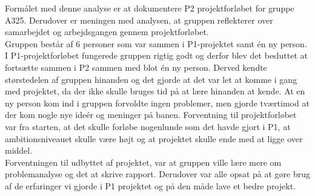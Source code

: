 Formålet med denne analyse er at dokumentere P2 projektforløbet for gruppe A325. Derudover er meningen med analysen, at gruppen reflekterer over samarbejdet og arbejdsgangen gennem projektforløbet.
\\
Gruppen består af 6 personer som var sammen i P1-projektet samt én ny person. I P1-projektforløbet fungerede gruppen rigtig godt og derfor blev det besluttet at fortsætte sammen i P2 sammen med blot én ny person. Derved kendte størstedelen af gruppen hinanden og det gjorde at det var let at komme i gang med projektet, da  der ikke skulle bruges tid på at lære hinanden at kende. At en ny person kom ind i gruppen forvoldte ingen problemer, men gjorde tværtimod at der kom nogle nye ideér og meninger på banen. Forventning til projektforløbet var fra starten, at det skulle forløbe nogenlunde som det havde gjort i P1, at ambitionsniveauet skulle være højt og at projektet skulle ende med at ligge over middel. 
\\
Forventningen til udbyttet af projektet, var at gruppen ville lære mere om problemanalyse og det at skrive rapport. Derudover var alle opsat på at gøre brug af de erfaringer vi gjorde i P1 projektet og på den måde lave et bedre projekt. 
